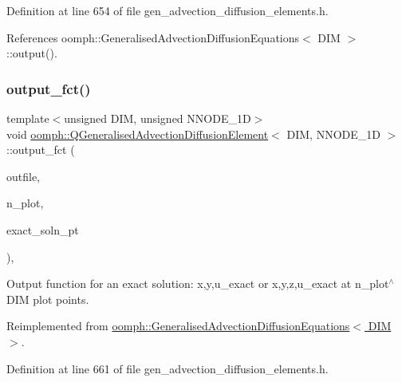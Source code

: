 Definition at line 654 of file gen\+\_\+advection\+\_\+diffusion\+\_\+elements.\+h.



References oomph\+::\+Generalised\+Advection\+Diffusion\+Equations$<$ D\+I\+M $>$\+::output().

\mbox{\label{classoomph_1_1QGeneralisedAdvectionDiffusionElement_ad45f14c0a13af6ac3cefd0a065bcec7c}} 
\subsubsection{\texorpdfstring{output\+\_\+fct()}{output\_fct()}\hspace{0.1cm}{\footnotesize\ttfamily [1/2]}}
{\footnotesize\ttfamily template$<$unsigned D\+IM, unsigned N\+N\+O\+D\+E\+\_\+1D$>$ \\
void \hyperlink{classoomph_1_1QGeneralisedAdvectionDiffusionElement}{oomph\+::\+Q\+Generalised\+Advection\+Diffusion\+Element}$<$ D\+IM, N\+N\+O\+D\+E\+\_\+1D $>$\+::output\+\_\+fct (\begin{DoxyParamCaption}\item[{std\+::ostream \&}]{outfile,  }\item[{const unsigned \&}]{n\+\_\+plot,  }\item[{\hyperlink{classoomph_1_1FiniteElement_a690fd33af26cc3e84f39bba6d5a85202}{Finite\+Element\+::\+Steady\+Exact\+Solution\+Fct\+Pt}}]{exact\+\_\+soln\+\_\+pt }\end{DoxyParamCaption})\hspace{0.3cm}{\ttfamily [inline]}, {\ttfamily [virtual]}}



Output function for an exact solution\+: x,y,u\+\_\+exact or x,y,z,u\+\_\+exact at n\+\_\+plot$^\wedge$\+D\+IM plot points. 



Reimplemented from \hyperlink{classoomph_1_1GeneralisedAdvectionDiffusionEquations_ac7bae95f78ecec53436902a7da1f6a92}{oomph\+::\+Generalised\+Advection\+Diffusion\+Equations$<$ D\+I\+M $>$}.



Definition at line 661 of file gen\+\_\+advection\+\_\+diffusion\+\_\+elements.\+h.



